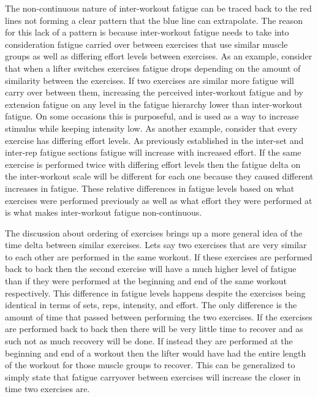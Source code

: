The non-continuous nature of inter-workout fatigue can be traced back to the red lines not forming a clear pattern that the blue line can extrapolate. The reason for this lack of a pattern is because inter-workout fatigue needs to take into consideration fatigue carried over between exercises that use similar muscle groups as well as differing effort levels between exercises. As an example, consider that when a lifter switches exercises fatigue drops depending on the amount of similarity between the exercises. If two exercises are similar more fatigue will carry over between them, increasing the perceived inter-workout fatigue and by extension fatigue on any level in the fatigue hierarchy lower than inter-workout fatigue. On some occasions this is purposeful, and is used as a way to increase stimulus while keeping intensity low. As another example, consider that every exercise has differing effort levels. As previously established in the inter-set and inter-rep fatigue sections fatigue will increase with increased effort. If the same exercise is performed twice with differing effort levels then the fatigue delta on the inter-workout scale will be different for each one because they caused different increases in fatigue. These relative differences in fatigue levels based on what exercises were performed previously as well as what effort they were performed at is what makes inter-workout fatigue non-continuous. 

The discussion about ordering of exercises brings up a more general idea of the time delta between similar exercises. Lets say two exercises that are very similar to each other are performed in the same workout. If these exercises are performed back to back then the second exercise will have a much higher level of fatigue than if they were performed at the beginning and end of the same workout respectively. This difference in fatigue levels happens despite the exercises being identical in terms of sets, reps, intensity, and effort. The only difference is the amount of time that passed between performing the two exercises. If the exercises are performed back to back then there will be very little time to recover and as such not as much recovery will be done. If instead they are performed at the beginning and end of a workout then the lifter would have had the entire length of the workout for those muscle groups to recover. This can be generalized to simply state that fatigue carryover between exercises will increase the closer in time two exercises are.

